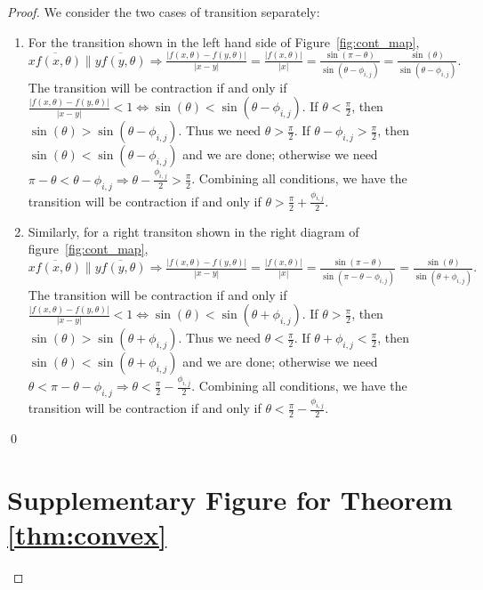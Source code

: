 \documentclass[]{styles/svproc}  %
\begin{document}
\begin{appendix}
\begin{proof}
We consider the two cases of transition separately:
\begin{enumerate}
    \item For the transition shown in the left hand side of Figure~\ref{fig:cont_map}, 
          $\overline{xf(x, \theta)} \parallel \overline{yf(y, \theta)} \Rightarrow \frac{|f(x, \theta)-f(y, \theta)|}{|x-y|} = \frac{|f(x, \theta)|}{|x|} = \frac{\sin(\pi - \theta)}{\sin(\theta - \phi_{i, j})} = \frac{\sin(\theta)}{\sin(\theta-\phi_{i, j})}.$ The transition will be contraction if and only if $\frac{|f(x, \theta)-f(y, \theta)|}{|x-y|} < 1 \iff \sin(\theta)<\sin(\theta-\phi_{i, j})$. If $\theta < \frac{\pi}{2}$, then $\sin(\theta) > \sin(\theta-\phi_{i, j})$. Thus we need $\theta>\frac{\pi}{2}$. If $\theta-\phi_{i, j} > \frac{\pi}{2}$, then $\sin(\theta) < \sin(\theta-\phi_{i, j})$ and we are done; otherwise we need $\pi - \theta < \theta-\phi_{i, j} \Rightarrow \theta - \frac{\phi_{i, j}}{2} > \frac{\pi}{2}$. Combining all conditions, we have the transition will be contraction if and only if $\theta >\frac{\pi}{2} + \frac{\phi_{i, j}}{2}$.
    \item Similarly, for a right transiton shown in the right diagram of figure~\ref{fig:cont_map}, $\overline{xf(x, \theta)} \parallel \overline{yf(y, \theta)} \Rightarrow \frac{|f(x, \theta)-f(y, \theta)|}{|x-y|} = \frac{|f(x, \theta)|}{|x|} = \frac{\sin(\pi - \theta)}{\sin(\pi -\theta-\phi_{i, j})} = \frac{\sin(\theta)}{\sin(\theta + \phi_{i, j})}.$ The transition will be contraction if and only if $\frac{|f(x, \theta)-f(y, \theta)|}{|x-y|} < 1 \iff \sin(\theta)<\sin(\theta+\phi_{i, j})$. If $\theta  > \frac{\pi}{2}$, then $\sin(\theta) > \sin(\theta + \phi_{i, j})$. Thus we need $\theta<\frac{\pi}{2}$. If $\theta+\phi_{i, j} < \frac{\pi}{2}$, then $\sin(\theta) < \sin(\theta+\phi_{i, j})$ and we are done; otherwise we need $\theta < \pi-\theta-\phi_{i, j} \Rightarrow \theta < \frac{\pi}{2} - \frac{\phi_{i, j}}{2}$. Combining all conditions, we have the transition will be contraction if and only if $\theta <\frac{\pi}{2} - \frac{\phi_{i, j}}{2}$.
\end{enumerate}
\qed

\section{Supplementary Figure for Theorem \ref{thm:convex}}


\end{proof}
\end{appendix}
\end{document}
